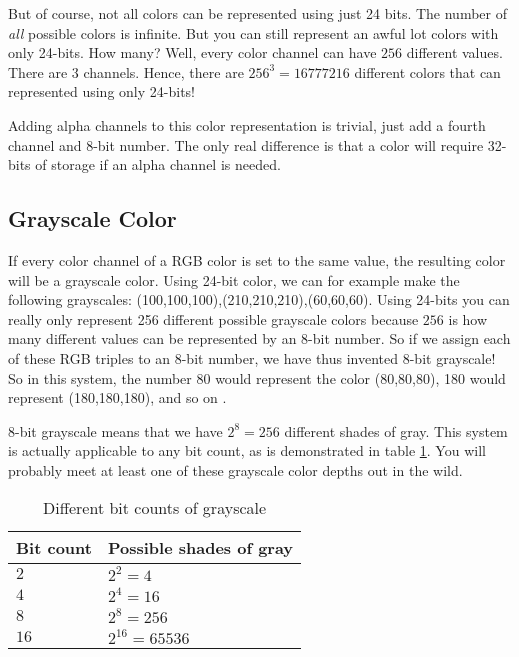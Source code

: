 \begin{refsection}
  But of course, not all colors can be represented using just
  24 bits. The number of \textit{all} possible colors is infinite. But you can still
  represent an awful lot colors with only 24-bits. How many? Well, every
  color channel can have $256$ different values. There are $3$
  channels. Hence, there are $256^3 = 16777216$ different colors that
  can represented using only 24-bits!

  \newcommand{\rgbaquad}[4]{
    \mbox{(\textcolor{red}{#1},\textcolor{green}{#2},\textcolor{blue}{#3},\textcolor{gray}{#4})}}

  Adding alpha channels to this color representation is trivial, just
  add a fourth channel and 8-bit number. The only real
  difference is that a color will require 32-bits of storage if an
  alpha channel is needed.

  \subsection{Grayscale Color}

  \newcommand{\selfrgbtrip}[3]{\mbox{\textcolor[RGB]{#1,#2,#3}{(#1,#2,#3)}}}
  \newcommand{\selfrgbtripgray}[1]{\selfrgbtrip{#1}{#1}{#1}}

  If every color channel of a RGB color is set to the same value, the
  resulting color will be a grayscale color. Using 24-bit color, we can for example make the following
  grayscales:
  \selfrgbtripgray{100},\selfrgbtripgray{210},\selfrgbtripgray{60}. Using
  24-bits you can really only represent 256 different possible
  grayscale colors because $256$ is how many different values can be
  represented by an 8-bit number. So if we assign each of these RGB
  triples to an 8-bit number, we have thus invented 8-bit
  grayscale! So in this system, the number 80
  would represent the color \selfrgbtripgray{80}, 180 would represent
  \selfrgbtripgray{180}, and so on \cite{puglia00:_handbook_dig_proj}.

  8-bit grayscale means that we have $2^8=256$ different shades of
  gray. This system is actually applicable to any bit count, as is
  demonstrated in table \ref{tab:grayscale}. You will probably meet at least one of
  these grayscale color depths out in the wild.

  \begin{table}
    \centering
    \begin{tabular}{ll}
      \toprule
      Bit count & Possible shades of gray \\
      \midrule
      $2$ & $2^2 = 4$ \\
      $4$ & $2^4 = 16$ \\
      $8$ & $2^8 = 256$ \\
      $16$ & $2^{16} = 65536$ \\
      \bottomrule
    \end{tabular}
    \caption{Different bit counts of grayscale}
    \label{tab:grayscale}
  \end{table}


\end{refsection}
